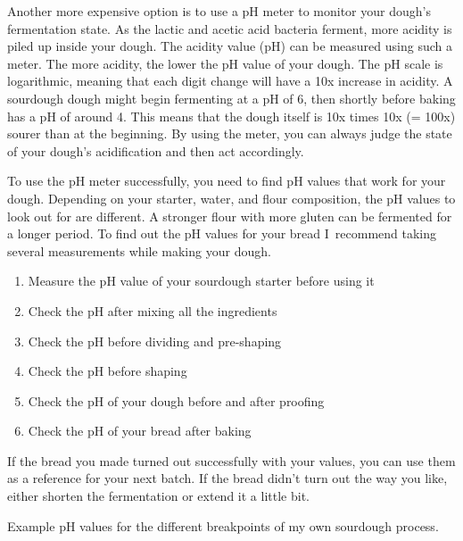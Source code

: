 Another more expensive option is to use a pH meter
to monitor your dough's fermentation state. As the lactic
and acetic acid bacteria ferment, more acidity is piled
up inside your dough. The acidity value (pH) can be
measured using such a meter. The more acidity, the lower the pH
value of your dough. The pH scale is logarithmic, meaning
that each digit change will have a 10x increase in acidity.
A sourdough dough might begin fermenting at a pH of 6,
then shortly before baking has a pH of around 4. This means
that the dough itself is 10x times 10x (= 100x) sourer
than at the beginning. By using the meter, you can always
judge the state of your dough's acidification and then act
accordingly.

To use the pH meter successfully, you need to find pH values
that work for your dough. Depending on your starter,
water, and flour composition, the pH values to look out
for are different. A stronger flour with more gluten
can be fermented for a longer period. To find out
the pH values for your bread I~recommend taking
several measurements while making your dough.

\begin{enumerate}
  \item Measure the pH value of your sourdough starter before using it
  \item Check the pH after mixing all the ingredients
  \item Check the pH before dividing and pre-shaping
  \item Check the pH before shaping
  \item Check the pH of your dough before and after proofing
  \item Check the pH of your bread after baking
\end{enumerate}

If the bread you made turned out successfully with your values,
you can use them as a reference for your next batch. If the
bread didn't turn out the way you like, either shorten
the fermentation or extend it a little bit.

\begin{table}[!htb]
    \begin{center}
        \caption[Dough's pH during bread preparation]{Example pH values for
            the different breakpoints of my own sourdough process.}%
        \label{table:sample-ph-values}
    \end{center}
\end{table}

